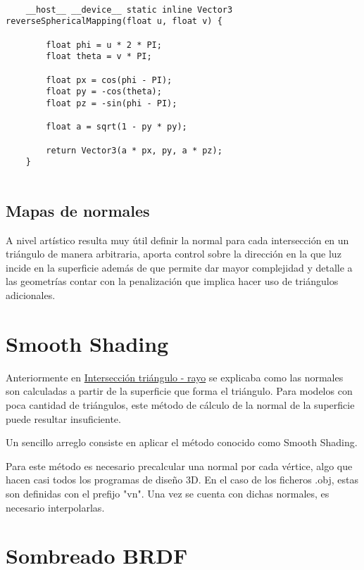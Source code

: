	\begin{lstlisting}
		
	__host__ __device__ static inline Vector3 reverseSphericalMapping(float u, float v) {

        float phi = u * 2 * PI;
        float theta = v * PI;

        float px = cos(phi - PI);
        float py = -cos(theta);
        float pz = -sin(phi - PI);

        float a = sqrt(1 - py * py);

        return Vector3(a * px, py, a * pz);
    }
	
	\end{lstlisting}
	
	
	\subsection{Mapas de normales}
	
	A nivel artístico resulta muy útil definir la normal para cada intersección en un triángulo de manera arbitraria, aporta control sobre la dirección en la que luz incide en la superficie además de que permite dar mayor complejidad y detalle a las geometrías contar con la penalización que implica hacer uso de triángulos adicionales. 
	
	
	\section{Smooth Shading}
	
	Anteriormente en \hyperref[subsec:triintersection]{Intersección triángulo - rayo} se explicaba como las normales son calculadas a partir de la superficie que forma el triángulo. Para modelos con poca cantidad de triángulos, este método de cálculo de la normal de la superficie puede resultar insuficiente.
	
	Un sencillo arreglo consiste en aplicar el método conocido como Smooth Shading. 
	
	Para este método es necesario precalcular una normal por cada vértice, algo que hacen casi todos los programas de diseño 3D. En el caso de los ficheros .obj, estas son definidas con el prefijo "vn". Una vez se cuenta con dichas normales, es necesario interpolarlas. 

	
	
	\section{Sombreado BRDF}
	
